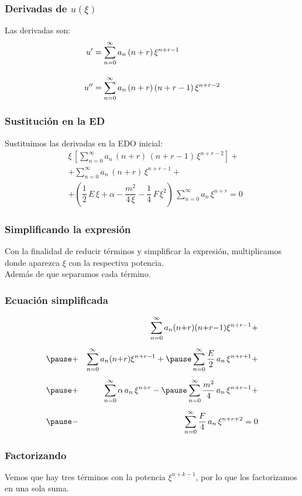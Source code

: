 \documentclass[12pt]{beamer}
\begin{document}
\begin{frame}
\frametitle{Derivadas de $u(\xi)$}
Las derivadas son:
\begin{align*}
{u}^{\prime} &= \sum_{n=0}^{\infty} a_{n} \, (n + r) \, \xi^{n+r-1} \\[1em]
{u}^{\prime \prime} &= \sum_{n=0}^{\infty} a_{n} \, (n + r) \, (n + r - 1) \, \xi^{n+r-2}
\end{align*}
\end{frame}
\begin{frame}
\frametitle{Sustitución en la ED}
Sustituimos las derivadas en la EDO inicial:
\pause
\begin{align*}
&\xi \, \left[ \sum_{n=0}^{\infty} a_{n} \, (n {+} r) \, (n {+} r {-} 1) \, \xi^{n{+}r{-}2} \right] + \\[1em]
&+ \sum_{n=0}^{\infty} a_{n} \, (n {+} r) \, \xi^{n{+}r{-}1} + \\[1em]
&+ \left( \dfrac{1}{2} \, E \, \xi {+} \alpha {-} \dfrac{m^{2}}{4 \, \xi} {-} \dfrac{1}{4} \, F \, \xi^{2} \right) \, \sum_{n=0}^{\infty} a_{n} \, \xi^{n{+}r} = 0
\end{align*}
\end{frame}
\begin{frame}
\frametitle{Simplificando la expresión}
Con la finalidad de reducir términos y simplificar la expresión, multiplicamos donde aparezca $\xi$ con la respectiva potencia.
\\
\bigskip
Además de que separamos cada término.
\end{frame}
\begin{frame}
\frametitle{Ecuación simplificada}
\vspace{-1cm}
\begin{eqnarray*}
&{}& \sum_{n=0}^{\infty} a_{n} (n {+} r) (n {+} r {-} 1) \xi^{n{+}r{-}1} + \\[0.5em] \pause
&+& \sum_{n=0}^{\infty} a_{n} (n {+} r) \xi^{n{+}r{-}1} + \pause \sum_{n=0}^{\infty} \dfrac{E}{2} \, a_{n} \, \xi^{n{+}r{+}1} + \\[0.5em] \pause
&+& \sum_{n=0}^{\infty} \alpha \, a_{n} \, \xi^{n{+}r} - \pause \sum_{n=0}^{\infty}  \dfrac{m^{2}}{4} \, a_{n} \, \xi^{n{+}r{-}1} + \\[0.5em]\pause
&-& \sum_{n=0}^{\infty} \dfrac{F}{4} \, a_{n} \, \xi^{n{+}r{+}2} = 0
\end{eqnarray*}
\end{frame}
\begin{frame}
\frametitle{Factorizando}
Vemos que hay tres términos con la potencia $\xi^{n+k-1}$, por lo que los factorizamos en una sola suma.
\end{frame}
\end{document}
